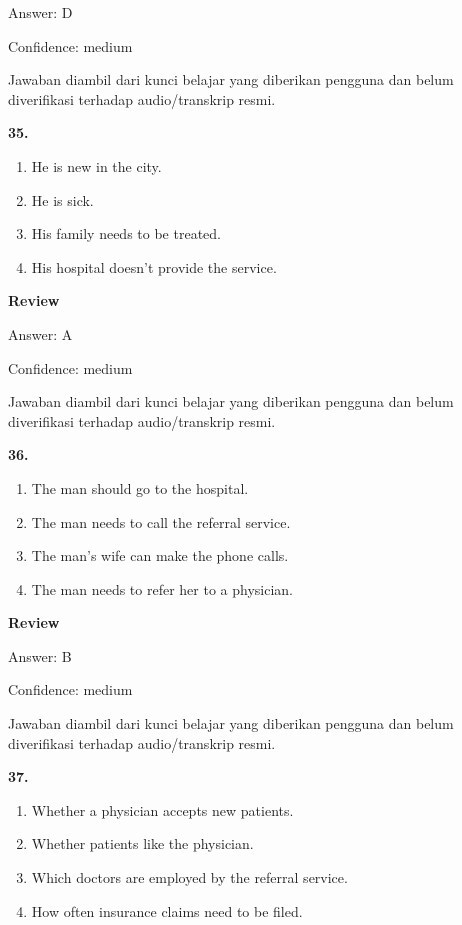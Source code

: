 \documentclass[12pt]{article}
\begin{document}
Answer: D\par
Confidence: medium\par
Jawaban diambil dari kunci belajar yang diberikan pengguna dan belum diverifikasi terhadap audio/transkrip resmi.\par
\endgroup
\par
\vspace{0.25\baselineskip}
\noindent\textbf{35.}
\begin{enumerate}[label=(\Alph*),leftmargin=*,itemsep=0.2em]
\item He is new in the city.
\item He is sick.
\item His family needs to be treated.
\item His hospital doesn't provide the service.
\end{enumerate}
\par
\begingroup
\setlength{\parskip}{0pt}
\setlength{\parindent}{0pt}
\textbf{Review}\par
Answer: A\par
Confidence: medium\par
Jawaban diambil dari kunci belajar yang diberikan pengguna dan belum diverifikasi terhadap audio/transkrip resmi.\par
\endgroup
\par
\vspace{0.25\baselineskip}
\noindent\textbf{36.}
\begin{enumerate}[label=(\Alph*),leftmargin=*,itemsep=0.2em]
\item The man should go to the hospital.
\item The man needs to call the referral service.
\item The man's wife can make the phone calls.
\item The man needs to refer her to a physician.
\end{enumerate}
\par
\begingroup
\setlength{\parskip}{0pt}
\setlength{\parindent}{0pt}
\textbf{Review}\par
Answer: B\par
Confidence: medium\par
Jawaban diambil dari kunci belajar yang diberikan pengguna dan belum diverifikasi terhadap audio/transkrip resmi.\par
\endgroup
\par
\vspace{0.25\baselineskip}
\noindent\textbf{37.}
\begin{enumerate}[label=(\Alph*),leftmargin=*,itemsep=0.2em]
\item Whether a physician accepts new patients.
\item Whether patients like the physician.
\item Which doctors are employed by the referral service.
\item How often insurance claims need to be filed.
\end{enumerate}
\end{document}

